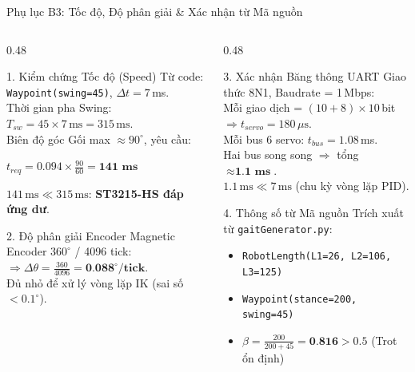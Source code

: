 \documentclass[10pt,aspectratio=169]{beamer}
\begin{document}
\begin{frame}{Phụ lục B3: Tốc độ, Độ phân giải \& Xác nhận từ Mã nguồn}
  \begin{columns}[t]
      \begin{column}{0.48\textwidth}
          \begin{block}{1. Kiểm chứng Tốc độ (Speed)}
              Từ code: \texttt{Waypoint(swing=45)}, $\Delta t = 7\,$ms.\\
              Thời gian pha Swing: $T_{sw} = 45 \times 7\,\text{ms} = 315\,\text{ms}$.\\
              Biên độ góc Gối max $\approx 90^\circ$, yêu cầu:
              \begin{center}
                  $t_{req} = 0.094 \times \frac{90}{60} = \textbf{141 ms}$
              \end{center}
              $141\,\text{ms} \ll 315\,\text{ms}$: \textbf{ST3215-HS đáp ứng dư}.
          \end{block}
          \vspace{0.05cm}
          \begin{block}{2. Độ phân giải Encoder}
              Magnetic Encoder $360^\circ$ / 4096 tick:\\
              $\Rightarrow \Delta\theta = \frac{360}{4096} = \textbf{0.088}^\circ/\textbf{tick}$.\\
              Đủ nhỏ để xử lý vòng lặp IK (sai số $< 0.1^\circ$).
          \end{block}
      \end{column}
      \begin{column}{0.48\textwidth}
          \begin{block}{3. Xác nhận Băng thông UART}
              Giao thức 8N1, Baudrate = 1\,Mbps:\\
              Mỗi giao dịch = $(10+8) \times 10\,$bit $\Rightarrow t_{servo} = 180\,\mu\text{s}$.\\
              Mỗi bus 6 servo: $t_{bus} = 1.08\,$ms.\\
              Hai bus song song $\Rightarrow$ tổng $\approx \textbf{1.1 ms}$.\\
              $1.1\,\text{ms} \ll 7\,\text{ms}$ (chu kỳ vòng lặp PID).
          \end{block}
          \vspace{0.05cm}
          \begin{block}{4. Thông số từ Mã nguồn}
              Trích xuất từ \texttt{gaitGenerator.py}:
              \begin{itemize}
                  \item \texttt{RobotLength(L1=26, L2=106, L3=125)}
                  \item \texttt{Waypoint(stance=200, swing=45)}
                  \item $\beta = \frac{200}{200+45} = \textbf{0.816} > 0.5$ {\small (Trot ổn định)}
              \end{itemize}
          \end{block}
      \end{column}
  \end{columns}
\end{frame}
\end{document}
